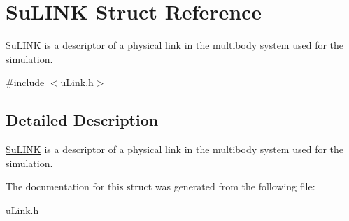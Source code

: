\hypertarget{struct_su_l_i_n_k}{\section{Su\-L\-I\-N\-K Struct Reference}
\label{struct_su_l_i_n_k}
}


\hyperlink{struct_su_l_i_n_k}{Su\-L\-I\-N\-K} is a descriptor of a physical link in the multibody system used for the simulation.  




{\ttfamily \#include $<$u\-Link.\-h$>$}



\subsection{Detailed Description}
\hyperlink{struct_su_l_i_n_k}{Su\-L\-I\-N\-K} is a descriptor of a physical link in the multibody system used for the simulation. 

The documentation for this struct was generated from the following file\-:\begin{DoxyCompactItemize}
\item 
\hyperlink{u_link_8h}{u\-Link.\-h}\end{DoxyCompactItemize}
